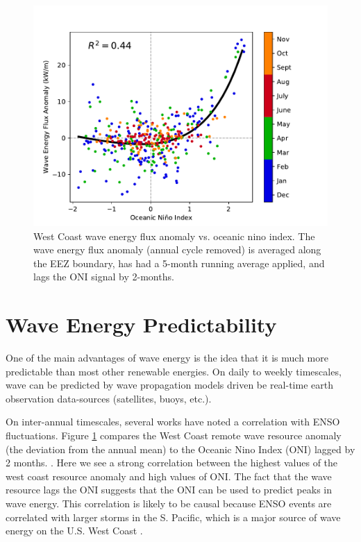 
\begin{figure}[ht]
  \centering
  \includegraphics[width=\textwidth]{../fig/ENSO-Comparison.wc.pdf}
  \caption{West Coast wave energy flux anomaly vs. oceanic nino index. The wave energy flux anomaly (annual cycle removed) is averaged along the EEZ boundary, has had a 5-month running average applied, and lags the ONI signal by 2-months.}
  \label{fig:wc-nino}
\end{figure}

\section{Wave Energy Predictability}

One of the main advantages of wave energy is the idea that it is much more predictable than most other renewable energies. On daily to weekly timescales, wave can be predicted by wave propagation models driven be real-time earth observation data-sources (satellites, buoys, etc.).

On inter-annual timescales, several works have noted a correlation with ENSO fluctuations. Figure \ref{fig:wc-nino} compares the West Coast remote wave resource anomaly (the deviation from the annual mean) to the Oceanic Nino Index (ONI) lagged by 2 months. \cite{nationaloceanicandatmosphericadministrationOceanicNinoIndex2020}.
Here we see a strong correlation between the highest values of the west coast resource anomaly and high values of ONI. The fact that the wave resource lags the ONI suggests that the ONI can be used to predict peaks in wave energy. This correlation is likely to be causal because ENSO events are correlated with larger storms in the S. Pacific, which is a major source of wave energy on the U.S. West Coast \citep{andersonClimateIndexOptimized2018, yangCharacteristicsVariabilityNearshore2020, ruggieroNationalAssessmentShoreline2013}.

